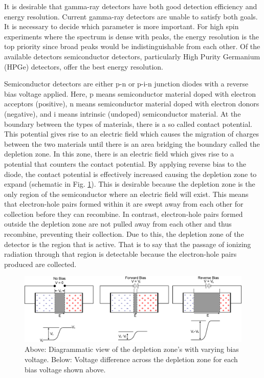 It is desirable that gamma-ray detectors have both good detection efficiency and energy resolution. Current gamma-ray detectors are unable to satisfy both goals. It is necessary to decide which parameter is more important. For high spin experiments where the spectrum is dense with peaks, the energy resolution is the top priority since broad peaks would be indistinguishable from each other. Of the available detectors semiconductor detectors, particularly High Purity Germanium (HPGe) detectors, offer the best energy resolution.

Semiconductor detectors are either p-n or p-i-n junction diodes with a reverse bias voltage applied. Here, p means semiconductor material doped with electron acceptors (positive), n means semiconductor material doped with electron donors (negative), and i means intrinsic (undoped) semiconductor material. At the boundary between the types of materials, there is a so called contact potential. This potential gives rise to an electric field which causes the migration of charges between the two materials until there is an area bridging the boundary called the depletion zone. In this zone, there is an electric field which gives rise to a potential that counters the contact potential. By applying reverse bias to the diode, the contact potential is effectively increased causing the depletion zone to expand (schematic in Fig. \ref{fig:chp3-pn_diode}). This is desirable because the depletion zone is the only region of the semiconductor where an electric field will exist. This means that electron-hole pairs formed within it are swept away from each other for collection before they can recombine. In contrast, electron-hole pairs formed outside the depletion zone are not pulled away from each other and thus recombine, preventing their collection. Due to this, the depletion zone of the detector is the region that is active. That is to say that the passage of ionizing radiation through that region is detectable because the electron-hole pairs produced are collected.

\begin{figure}[h!]
	\centerline{\includegraphics[width=\textwidth]{./img/c3/pn-diode.eps}}
	\caption{Above: Diagrammatic view of the depletion zone's with varying bias voltage. Below: Voltage difference across the depletion zone for each bias voltage shown above.\label{fig:chp3-pn_diode}}
\end{figure}

